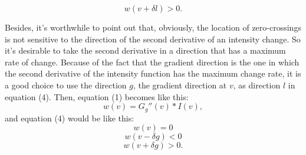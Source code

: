 \documentclass{article}
\begin{document}
\begin{equation*}
    w(v+\delta l) > 0.
\end{equation*}\par
Besides, it's worthwhile to point out that, obviously, the location of
zero-crossings is not sensitive to the direction of the second derivative of an
intensity change. So it's desirable to take the second derivative in a direction
that has a maximum rate of change. Because of the fact that the gradient
direction is the one in which the second derivative of the intensity function
has the maximum change rate, it is a good choice to use the direction $g$, the
gradient direction at $v$, as direction $l$ in equation (4). Then, equation (1)
becomes like this:
\begin{equation}
  w(v) = G_g''(v) * I(v),
\end{equation}
and equation (4) would be like this:
\begin{equation*}
  w(v) = 0
\end{equation*}
\begin{equation}
    w(v-\delta g) < 0
\end{equation}
\begin{equation*}
    w(v+\delta g) > 0.
\end{equation*}  
\end{document}
